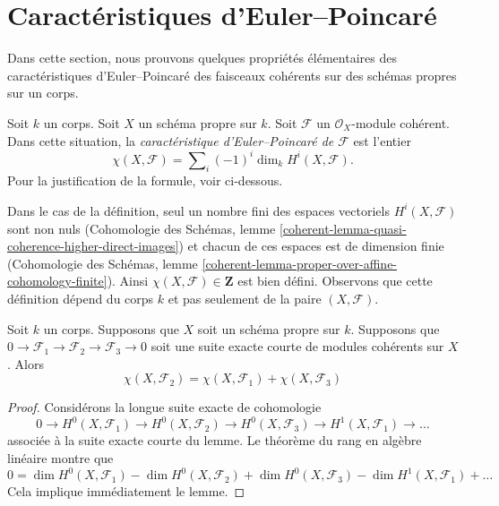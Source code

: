 \section{Caractéristiques d'Euler--Poincaré}
\label{section-euler}

\noindent
Dans cette section, nous prouvons quelques propriétés élémentaires des
caractéristiques d'Euler--Poincaré des faisceaux cohérents sur des schémas propres sur un corps.

\begin{definition}
\label{definition-euler-characteristic}
Soit $k$ un corps. Soit $X$ un schéma propre sur $k$. Soit
$\mathcal{F}$ un $\mathcal{O}_X$-module cohérent. Dans cette
situation, la {\it caractéristique d'Euler--Poincaré de $\mathcal{F}$ } est l'entier
$$
\chi(X, \mathcal{F}) = \sum\nolimits_i (-1)^i \dim_k H^i(X, \mathcal{F}).
$$
Pour la justification de la formule, voir ci-dessous.
\end{definition}

\noindent
Dans le cas de la définition, seul un nombre fini des
espaces vectoriels $H^i(X, \mathcal{F})$ sont non nuls
(Cohomologie des Schémas, lemme
\ref{coherent-lemma-quasi-coherence-higher-direct-images})
et chacun de ces espaces est de dimension finie (Cohomologie
des Schémas, lemme
\ref{coherent-lemma-proper-over-affine-cohomology-finite}). Ainsi
$\chi(X, \mathcal{F}) \in \mathbf{Z}$ est bien défini. Observons que cette
définition dépend du corps $k$ et pas seulement de la paire $(X, \mathcal{F})$.

\begin{lemma}
\label{lemma-euler-characteristic-additive}
Soit $k$ un corps. Supposons que $X$ soit un schéma propre
sur $k$. Supposons que $0 \to \mathcal{F}_1 \to \mathcal{F}_2 \to
\mathcal{F}_3 \to 0$ soit une suite exacte courte de modules cohérents sur $X$. Alors
$$
\chi(X, \mathcal{F}_2) = \chi(X, \mathcal{F}_1) + \chi(X, \mathcal{F}_3)
$$
\end{lemma}

\begin{proof}
Considérons la longue suite exacte de cohomologie
$$
0 \to H^0(X, \mathcal{F}_1) \to H^0(X, \mathcal{F}_2) \to
H^0(X, \mathcal{F}_3) \to H^1(X, \mathcal{F}_1) \to \ldots
$$
associée à la suite exacte courte du lemme. Le théorème
du rang en algèbre linéaire montre que
$$
0 = \dim H^0(X, \mathcal{F}_1) - \dim H^0(X, \mathcal{F}_2)
+ \dim H^0(X, \mathcal{F}_3) - \dim H^1(X, \mathcal{F}_1) + \ldots
$$
Cela implique immédiatement le lemme.
\end{proof}

